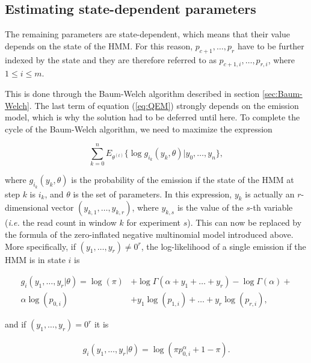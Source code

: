 \documentclass[12pt]{article}
\begin{document}
\begin{appendices}
\subsection{Estimating state-dependent parameters}

    The remaining parameters are state-dependent, which means that
    their value depends on the state of the HMM. For this reason,
    $p_{c+1}, \ldots, p_r$ have to be further indexed by the state
    and they are therefore referred to as
    $p_{c+1,i}, \ldots, p_{r,i}$, where $1 \leq i \leq m$.

    This is done through the Baum-Welch algorithm described in
    section \ref{sec:Baum-Welch}. The last term of equation
    (\ref{eq:QEM}) strongly depends on the emission model, which
    is why the solution had to be deferred until here. To complete
    the cycle of the Baum-Welch algorithm, we need to maximize
    the expression

    \begin{equation*}
      \sum_{k=0}^n E_{\theta^{(t)}} \Big\{
      \log g_{i_k}(y_k, \theta) \Big| y_0, \ldots, y_n \Big\},
    \end{equation*}

    \noindent
    where $g_{i_k}(y_k, \theta)$ is the probability of the emission
    if the state of the HMM at step $k$ is $i_k$, and $\theta$ is
    the set of parameters. In this expression, $y_k$ is actually
    an $r$-dimensional vector $(y_{k,1}, \ldots, y_{k,r})$, where
    $y_{k,s}$ is the value of the $s$-th variable (\textit{i.e.}
    the read count in window $k$ for experiment $s$).
    This can now be replaced by the formula
    of the zero-inflated negative multinomial model introduced above.
    More specifically, if $(y_1, \ldots, y_r) \neq 0^r$, the
    log-likelihood of a single emission if the HMM is in state $i$ is

    \begin{align*}
      g_i(y_1, \ldots, y_r|\theta) =
      \log(\pi) &+ \log\Gamma(\alpha+y_1+\ldots+y_r) -
      \log\Gamma(\alpha) + \\
      \alpha\log(p_{0,i}) &+ y_1 \log(p_{1,i}) + \ldots +
      y_r \log(p_{r,i}),
    \end{align*}

    \noindent
    and if $(y_1, \ldots, y_r) = 0^r$ it is

    \begin{align*}
      g_i(y_1, \ldots, y_r|\theta) = \log(\pi p_{0,i}^{\alpha}+1-\pi).
    \end{align*}


\end{appendices}
\end{document}
